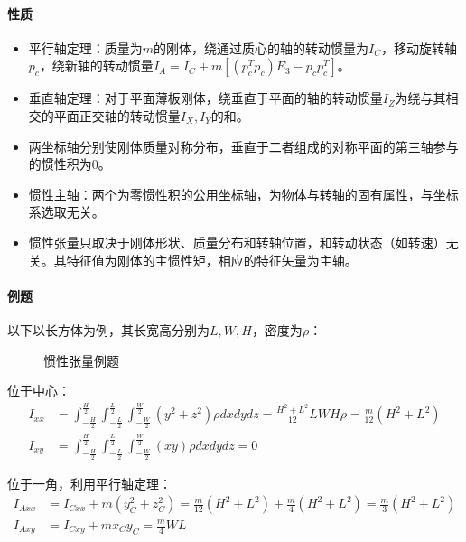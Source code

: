 \documentclass[
12pt, %
a4paper, 
oneside, %
headinclude,footinclude, %
]{scrartcl}
\begin{document}
\paragraph{性质}
\begin{itemize}
\item 平行轴定理：质量为$ m $的刚体，绕通过质心的轴的转动惯量为$ I_C $，移动旋转轴$ p_c $，绕新轴的转动惯量$ I_A = I_C + m[(p_c^Tp_c)E_3 - p_cp_c^T] $。
\item 垂直轴定理：对于平面薄板刚体，绕垂直于平面的轴的转动惯量$ I_Z $为绕与其相交的平面正交轴的转动惯量$ I_X,I_Y $的和。
\item 两坐标轴分别使刚体质量对称分布，垂直于二者组成的对称平面的第三轴参与的惯性积为$ 0 $。
\item 惯性主轴：两个为零惯性积的公用坐标轴，为物体与转轴的固有属性，与坐标系选取无关。
\item 惯性张量只取决于刚体形状、质量分布和转轴位置，和转动状态（如转速）无关。其特征值为刚体的主惯性矩，相应的特征矢量为主轴。
\end{itemize}
\paragraph{例题}
以下以长方体为例，其长宽高分别为$ L,W,H $，密度为$ \rho $：

\begin{figure}[H]
\centering
\subfloat[位于中心]{\texttt{[image: 6.1]}} \quad
\subfloat[位于一角]{\texttt{[image: 6.2]}}
\caption[惯性张量例题]{惯性张量例题}
\end{figure}

位于中心：
\begin{align*}
I_{xx} &= \int_{-\frac{H}{2}}^{\frac{H}{2}} \int_{-\frac{L}{2}}^{\frac{L}{2}} \int_{-\frac{W}{2}}^{\frac{W}{2}} (y^2 + z^2)\rho dxdydz = \frac{H^2 + L^2}{12} LWH\rho = \frac{m}{12}(H^2 + L^2) \\
I_{xy} &= \int_{-\frac{H}{2}}^{\frac{H}{2}} \int_{-\frac{L}{2}}^{\frac{L}{2}} \int_{-\frac{W}{2}}^{\frac{W}{2}} (xy)\rho dxdydz = 0
\end{align*}

位于一角，利用平行轴定理：
\begin{align*}
I_{Axx} &= I_{Cxx} + m(y_C^2 + z_C^2) = \frac{m}{12}(H^2 + L^2) + \frac{m}{4}(H^2 + L^2) = \frac{m}{3}(H^2 + L^2) \\
I_{Axy} &= I_{Cxy} + m x_C y_C = \frac{m}{4}WL
\end{align*}
\end{document}
